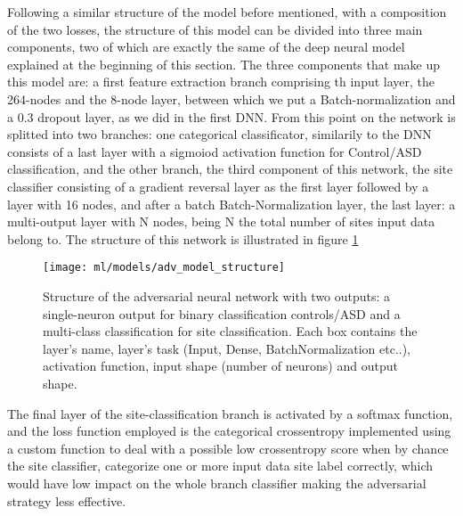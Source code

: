 \documentclass[11pt]{report}
\begin{document}
Following a similar structure of the model before mentioned, with a composition of the two losses, the structure of this model can be divided into three main components, two of which are exactly the same of the deep neural model explained at the beginning of this section.
The three components that make up this model are: a first feature extraction branch comprising th input layer, the 264-nodes and the 8-node layer, between which we put a Batch-normalization and a 0.3 dropout layer, as we did in the first DNN.
From this point on the network is splitted into two branches: one categorical classificator, similarily to the DNN consists of a last layer with a sigmoiod activation function for Control/ASD classification,
and the other branch, the third component of this network, the site classifier consisting of a gradient reversal layer as the first layer followed by a layer with 16 nodes, and after a batch Batch-Normalization layer, the last layer: a multi-output layer with N nodes, being N the total number of sites input data belong to.
The structure of this network is illustrated in figure \ref{fig:adv_model_structure}


\begin{figure}[h!]
\centering
\texttt{[image: ml/models/adv\_model\_structure]}
\caption{Structure of the adversarial neural network with two outputs: a single-neuron output for binary classification controls/ASD and a multi-class classification for site classification.
Each box contains the layer's name, layer's task (Input, Dense, BatchNormalization etc..), activation function, input shape (number of neurons) and output shape.
}
\label{fig:adv_model_structure}
\end{figure}


The final layer of the site-classification branch is activated by a softmax function, and the loss function employed is the categorical crossentropy implemented using a custom function to deal with a possible low crossentropy score when by chance the site classifier, categorize one or more input data site label correctly, which would have low impact on the whole branch classifier making the adversarial strategy less effective.
\end{document}
